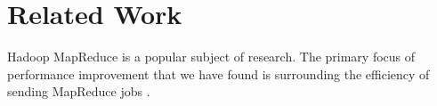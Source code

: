 \section{Related Work}
\label{section:relatedwork}
Hadoop MapReduce is a popular subject of research. The primary focus of 
performance improvement that we have found is surrounding the efficiency of 
sending MapReduce jobs \cite{LevitatedMerge}.
